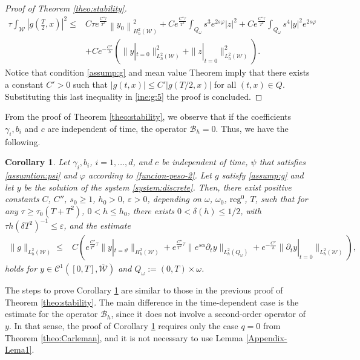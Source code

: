\documentclass{amsart}
\numberwithin{equation}{section}
\newtheorem{corollary}[theorem]{Corollary}
\begin{document}
\begin{proof}[Proof of Theorem \ref{theo:stability}]
\begin{equation}\label{ine:g:5}
\begin{aligned}
    \tau\int_{\mathcal{W}}\left|g\left( \frac{T}{2},x\right)\right|^{2}\leq &C \tau e^{\frac{C''\tau}{T^{2}}}\left\| y_{0}\right\|^{2}_{H^{2}_{h}(\mathcal{W})}+Ce^{\frac{C''\tau}{T^2}}\int_{Q_{\omega}}s^{3}e^{2s\varphi}|z|^{2}+Ce^{\frac{C''\tau}{T^2}}\int_{Q_{ \omega}}s^{4}|y|^{2}e^{2s\varphi}\\
&+Ce^{-\frac{C''}{h}}\left(\|y|_{t=0}\|_{L^2_h(\mathcal{W})}^2+\|z|_{t=0}\|_{L^2_h(\mathcal{W})}^2\right).
\end{aligned}
\end{equation}
Notice that condition \eqref{assump:g} and mean value Theorem imply that there exists a constant $C'>0$ such that $|g(t,x)|\leq C'\left| g(T/2,x)\right|$ for all $(t,x)\in Q$. Substituting this last inequality in \eqref{ine:g:5} the proof is concluded.
\end{proof}

From the proof of Theorem \ref{theo:stability}, we observe that if the coefficients $\gamma_i, b_i$ and $c$ are independent of time, the operator $\mathcal{B}_h=0$. Thus, we have the following.
\begin{corollary}\label{theo:stability_idependentTime}
Let $\gamma_i, b_i$, $i=1,\ldots,d$, and $c$ be independent of time, $\psi$ that satisfies \eqref{assumtion:psi} and $\varphi$ according to \eqref{funcion-peso-2}. Let $g$ satisfy \eqref{assump:g} and let $y$ be the solution of the system \eqref{system:discrete}. Then, there exist positive constants $C$, $C''$,  $s_{0}\geq 1$, $h_{0}>0$, $\varepsilon >0$, depending on $\omega$, $\omega_{0}$, $\mbox{reg}^{0}$, $T$, such that for any $\tau\geq \tau_{0}(T+T^{2})$, $0<h\leq h_{0}$, there exists $0<\delta(h)\leq1/2$, with $\tau h(\delta T^{2})^{-1}\leq \varepsilon$, and the estimate
\begin{equation*}
    \begin{aligned}
    \|g\|_{L_h^2(\mathcal{W})}\leq &C\left(e^{\frac{C''}{T^2}\tau}\|y|_{t=\vartheta}\|_{H_h^2(\mathcal{W})}+e^{\frac{C''}{T^2}\tau}\|e^{s\alpha}\partial_{t}y\|_{L_h^2(Q_\omega)}
    +e^{-\frac{C''}{h}}\|\partial_{t}y|_{t=0}\|_{L^2_h(\mathcal{W})}\right),
    \end{aligned}
\end{equation*}
holds for $y\in\mathcal{C}^{1}([0,T],\overline{\mathcal{W}})$ and $Q_{\omega}:= (0,T)\times\omega$.
\end{corollary}

The steps to prove Corollary \ref{theo:stability_idependentTime} are similar to those in the previous proof of Theorem \ref{theo:stability}. The main difference in the time-dependent case is the estimate for the operator ${\mathcal{B}}_{h}$, since it does not involve a second-order operator of $y$. In that sense, the proof of Corollary \ref{theo:stability_idependentTime} requires only the case $q=0$ from Theorem \ref{theo:Carleman}, and it is not necessary to use Lemma \ref{Appendix-Lema1}. 
\end{document}
